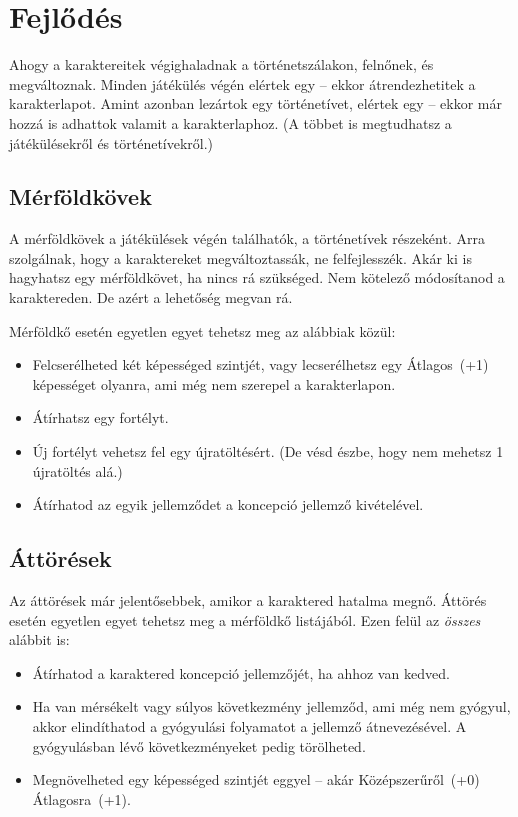 \chapter{Fejlődés}

Ahogy a karaktereitek végighaladnak a történetszálakon, felnőnek, és megváltoznak. Minden játékülés végén elértek egy  -- ekkor átrendezhetitek a karakterlapot. Amint azonban lezártok egy történetívet, elértek egy  -- ekkor már hozzá is adhattok valamit a karakterlaphoz. (A  többet is megtudhatsz a játékülésekről és történetívekről.)

\section{Mérföldkövek}

A mérföldkövek a játékülések végén találhatók, a történetívek részeként. Arra szolgálnak, hogy a karaktereket megváltoztassák, ne felfejlesszék. Akár ki is hagyhatsz egy mérföldkövet, ha nincs rá szükséged. Nem kötelező módosítanod a karaktereden. De azért a lehetőség megvan rá.

Mérföldkő esetén egyetlen egyet tehetsz meg az alábbiak közül:

\begin{itemize}
    \item Felcserélheted két képességed szintjét, vagy lecserélhetsz egy Átlagos~(+1) képességet olyanra, ami még nem szerepel a karakterlapon.
    \item Átírhatsz egy fortélyt.
    \item Új fortélyt vehetsz fel egy újratöltésért. (De vésd észbe, hogy nem mehetsz 1 újratöltés alá.)
    \item Átírhatod az egyik jellemződet a koncepció jellemző kivételével.
\end{itemize}

\section{Áttörések}

Az áttörések már jelentősebbek, amikor a karaktered hatalma megnő. Áttörés esetén egyetlen egyet tehetsz meg a mérföldkő listájából. Ezen felül az \emph{összes} alábbit is:

\begin{itemize}
    \item Átírhatod a karaktered koncepció jellemzőjét, ha ahhoz van kedved.
    \item Ha van mérsékelt vagy súlyos következmény jellemződ, ami még nem gyógyul, akkor elindíthatod a gyógyulási folyamatot a jellemző átnevezésével. A gyógyulásban lévő következményeket pedig törölheted.
    \item Megnövelheted egy képességed szintjét eggyel -- akár Középszerűről~(+0) Átlagosra~(+1).
\end{itemize}

